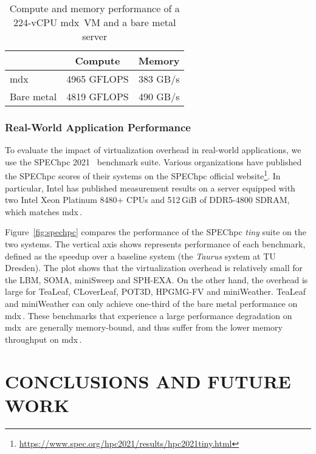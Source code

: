 \documentclass[a4paper,twoside]{article}
\newcommand{\mdx}{mdx\,\uppercase\expandafter{\romannumeral 2\relax}}
\begin{document}
\begin{table}
\centering
\caption{Compute and memory performance of a 224-vCPU \mdx{} VM and a bare metal server}\label{tbl:cm-full}
\begin{tabular}{@{}lrr@{}}
\toprule
\multicolumn{1}{c}{} & \multicolumn{1}{c}{Compute} & \multicolumn{1}{c}{Memory} \\ \midrule
\mdx{}               & 4965 GFLOPS                 & 383 GB/s                   \\
Bare metal           & 4819 GFLOPS                 & 490 GB/s                    \\ \bottomrule
\end{tabular}
\end{table}

\subsubsection{Real-World Application Performance}

To evaluate the impact of virtualization overhead in real-world applications, we use the SPEChpc
2021~\cite{Li2022} benchmark suite.
Various organizations have published the SPEChpc scores of their systems on the SPEChpc official
website\footnote{\url{https://www.spec.org/hpc2021/results/hpc2021tiny.html}}.
In particular, Intel has published measurement results on a server equipped with two Intel Xeon
Platinum 8480+ CPUs and 512\,GiB of DDR5-4800 SDRAM, which matches \mdx{}. 

Figure~\ref{fig:spechpc} compares the performance of the SPEChpc \emph{tiny} suite on the two
systems. The vertical axis shows represents performance of each benchmark, defined as the speedup
over a baseline system (the \emph{Taurus} system at TU Dresden). The plot shows that the
virtualization overhead is relatively small for the LBM, SOMA, miniSweep and SPH-EXA.
On the other hand, the overhead is large for TeaLeaf, CLoverLeaf, POT3D, HPGMG-FV and miniWeather.
TeaLeaf and miniWeather can only achieve one-third of the bare metal performance on \mdx{}. These
benchmarks that experience a large performance degradation on \mdx{} are generally memory-bound, and
thus suffer from the lower memory throughput on \mdx{}.

\section{\uppercase{Conclusions and Future Work}}%
\label{sec:conclusion}
\end{document}

